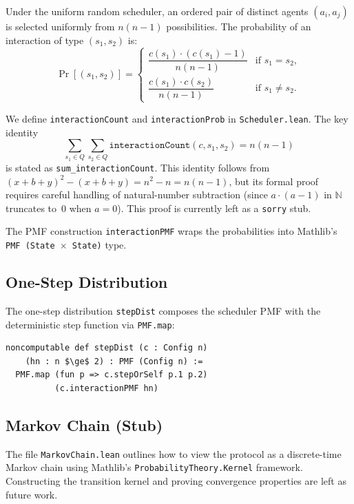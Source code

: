 \documentclass[11pt,a4paper]{article}
\begin{document}
Under the uniform random scheduler, an ordered pair of distinct agents
$(a_i, a_j)$ is selected uniformly from $n(n-1)$ possibilities.
The probability of an interaction of type $(s_1, s_2)$ is:
\[
  \Pr[(s_1, s_2)] =
  \begin{cases}
    \dfrac{c(s_1) \cdot (c(s_1) - 1)}{n(n-1)} & \text{if } s_1 = s_2, \\[6pt]
    \dfrac{c(s_1) \cdot c(s_2)}{n(n-1)} & \text{if } s_1 \neq s_2.
  \end{cases}
\]

We define \texttt{interactionCount} and \texttt{interactionProb} in
\texttt{Scheduler.lean}.  The key identity
\[
  \sum_{s_1 \in Q} \sum_{s_2 \in Q}
  \texttt{interactionCount}(c, s_1, s_2) = n(n-1)
\]
is stated as \texttt{sum\_interactionCount}.  This identity follows from
$(x+b+y)^2 - (x+b+y) = n^2 - n = n(n-1)$, but its formal proof requires
careful handling of natural-number subtraction (since $a \cdot (a-1)$ in
$\mathbb{N}$ truncates to~0 when $a=0$).  This proof is currently left as
a \texttt{sorry} stub.

The PMF construction \texttt{interactionPMF} wraps the probabilities into
Mathlib's \texttt{PMF (State $\times$ State)} type.

\subsection{One-Step Distribution}

The one-step distribution \texttt{stepDist} composes the scheduler PMF
with the deterministic step function via \texttt{PMF.map}:

\begin{lstlisting}
noncomputable def stepDist (c : Config n)
    (hn : n $\ge$ 2) : PMF (Config n) :=
  PMF.map (fun p => c.stepOrSelf p.1 p.2)
          (c.interactionPMF hn)
\end{lstlisting}

\subsection{Markov Chain (Stub)}

The file \texttt{MarkovChain.lean} outlines how to view the protocol as a
discrete-time Markov chain using Mathlib's
\texttt{ProbabilityTheory.Kernel} framework.  Constructing the transition
kernel and proving convergence properties are left as future work.

\end{document}
